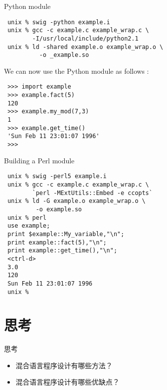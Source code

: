\begin{frame}[containsverbatim]{Python module}
\begin{lstlisting} 
 unix % swig -python example.i
 unix % gcc -c example.c example_wrap.c \
        -I/usr/local/include/python2.1
 unix % ld -shared example.o example_wrap.o \
          -o _example.so 
\end{lstlisting} 
We can now use the Python module as follows :
\begin{lstlisting} 
 >>> import example
 >>> example.fact(5)
 120
 >>> example.my_mod(7,3)
 1
 >>> example.get_time()
 'Sun Feb 11 23:01:07 1996'
 >>>
\end{lstlisting} 
\end{frame}

\begin{frame}[containsverbatim]{Building a Perl module}

\begin{lstlisting} 
 unix % swig -perl5 example.i
 unix % gcc -c example.c example_wrap.c \
        `perl -MExtUtils::Embed -e ccopts`
 unix % ld -G example.o example_wrap.o \
         -o example.so
 unix % perl
 use example;
 print $example::My_variable,"\n";
 print example::fact(5),"\n";
 print example::get_time(),"\n";
 <ctrl-d>
 3.0
 120
 Sun Feb 11 23:01:07 1996
 unix % 
\end{lstlisting}
\end{frame}

\section{思考}
\begin{frame}{思考}
\begin{itemize}
\item 混合语言程序设计有哪些方法？
\item 混合语言程序设计有哪些优缺点？
\end{itemize}
\end{frame}


